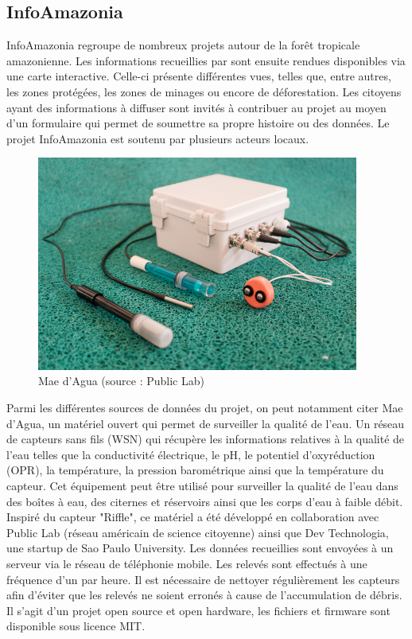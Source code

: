 \documentclass[10pt, article]{llncs}
\begin{document}
	\subsection{InfoAmazonia}
		InfoAmazonia regroupe de nombreux projets autour de la forêt tropicale amazonienne. Les informations recueillies par sont ensuite rendues disponibles via une carte interactive. Celle-ci présente différentes vues, telles que, entre autres, les zones protégées, les zones de minages ou encore de déforestation. Les citoyens ayant des informations à diffuser sont invités à contribuer au projet au moyen d'un formulaire qui permet de soumettre sa propre histoire ou des données. Le projet InfoAmazonia est soutenu par plusieurs acteurs locaux.\\
		\begin{figure}
			\begin{center}
				\includegraphics[width=300pt]{img/mae-dagua.jpg}
			\end{center}
			\caption{Mae d'Agua (source : Public Lab)}
		\end{figure}
		Parmi les différentes sources de données du projet, on peut notamment citer Mae d'Agua, un matériel ouvert qui permet de surveiller la qualité de l'eau. Un réseau de capteurs sans fils (WSN) qui récupère les informations relatives à la qualité de l'eau telles que la conductivité électrique, le pH, le potentiel d'oxyréduction (OPR), la température, la pression barométrique ainsi que la température du capteur. Cet équipement peut être utilisé pour surveiller la qualité de l'eau dans des boîtes à eau, des citernes et réservoirs ainsi que les corps d'eau à faible débit. Inspiré du capteur "Riffle", ce matériel a été développé en collaboration avec Public Lab (réseau américain de science citoyenne) ainsi que Dev Technologia, une startup de Sao Paulo University. Les données recueillies sont envoyées à un serveur via le réseau de téléphonie mobile. Les relevés sont effectués à une fréquence d'un par heure. Il est nécessaire de nettoyer régulièrement les capteurs afin d'éviter que les relevés ne soient erronés à cause de l'accumulation de débris. Il s'agit d'un projet open source et open hardware, les fichiers et firmware sont disponible sous licence MIT. \\
\end{document}
